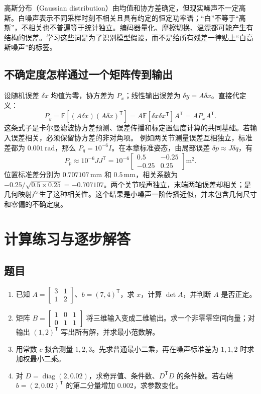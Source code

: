 高斯分布（Gaussian distribution）由均值和协方差确定，但现实噪声不一定高斯。白噪声表示不同采样时刻不相关且具有约定的恒定功率谱；“白”不等于“高斯”，不相关也不普遍等于统计独立。编码器量化、摩擦切换、温漂都可能产生有结构的误差。学习这些词是为了识别模型假设，而不是给所有残差一律贴上“白高斯噪声”的标签。


\subsection{不确定度怎样通过一个矩阵传到输出}
设随机误差 $\delta x$ 均值为零，协方差为 $P_x$；线性输出误差为 $\delta y=A\delta x$。直接代定义：
\begin{equation}
 P_y=\mathbb E[(A\delta x)(A\delta x)^\mathsf T]
 =A\mathbb E[\delta x\delta x^\mathsf T]A^\mathsf T
 =AP_xA^\mathsf T.
\end{equation}
这条式子是卡尔曼滤波协方差预测、误差传播和标定置信度计算的共同基础。若输入误差相关，必须保留协方差的非对角项。
例如两关节测量误差互相独立，标准差都为 $0.001\,\mathrm{rad}$，那么 $P_q=10^{-6}I$。在本章标准姿态，由局部误差 $\delta p\approx J\delta q$，有
\[
 P_p\approx10^{-6}JJ^\mathsf T
 =10^{-6}\begin{bmatrix}0.5&-0.25\\-0.25&0.25\end{bmatrix}\mathrm{m^2}.
\]
位置标准差分别为 $0.707107\,\mathrm{mm}$ 和 $0.5\,\mathrm{mm}$，相关系数为 $-0.25/\sqrt{0.5\times0.25}=-0.707107$。两个关节噪声独立，末端两轴误差却相关；是几何映射产生了这种相关性。这个结果是小噪声一阶传播近似，并未包含几何尺寸和零偏的不确定度。

\section{计算练习与逐步解答}
\subsection*{题目}
\begin{enumerate}
\item 已知 $A=\begin{bmatrix}3&1\\1&2\end{bmatrix}$、$b=(7,4)^\mathsf T$，求 $x$，计算 $\det A$，并判断 $A$ 是否正定。
\item 矩阵 $B=\begin{bmatrix}1&0&1\\0&1&1\end{bmatrix}$ 将三维输入变成二维输出。求一个非零零空间向量；对输出 $(1,2)^\mathsf T$ 写出所有解，并求最小范数解。
\item 用常数 $c$ 拟合测量 $1,2,3$。先求普通最小二乘，再在噪声标准差为 $1,1,2$ 时求加权最小二乘。
\item 对 $D=\operatorname{diag}(2,0.02)$，求奇异值、条件数、$D^\mathsf TD$ 的条件数。若右端 $b=(2,0.02)^\mathsf T$ 的第二分量增加 0.002，求参数变化。
\end{enumerate}
